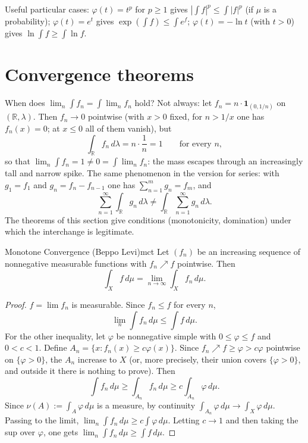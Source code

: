 \documentclass[11pt, a4paper]{article}
\begin{document}
\obs Useful particular cases: $\varphi(t) = t^p$ for $p \ge 1$ gives $|\int f|^p \le \int |f|^p$ (if
$\mu$ is a probability); $\varphi(t) = e^t$ gives $\exp(\int f) \le \int e^f$; $\varphi(t) = -\ln t$
(with $t > 0$) gives $\ln \int f \ge \int \ln f$.

\newpage

\section{Convergence theorems}

When does $\lim_n \int f_n = \int \lim_n f_n$ hold? Not always: let $f_n = n \cdot
\mathbf{1}_{(0, 1/n)}$ on $(\mathbb{R}, \lambda)$. Then $f_n \to 0$ pointwise (with
$x > 0$ fixed, for $n > 1/x$ one has $f_n(x) = 0$; at $x \le 0$ all of them vanish), but
$$ \int_{\mathbb{R}} f_n \, d\lambda = n \cdot \frac{1}{n} = 1 \qquad \text{for every } n, $$
so that $\lim_n \int f_n = 1 \ne 0 = \int \lim_n f_n$: the mass escapes through an increasingly
tall and narrow spike. The same phenomenon in the version for series: with $g_1 = f_1$ and
$g_n = f_n - f_{n-1}$ one has $\sum_{n=1}^m g_n = f_m$, and
$$ \sum_{n=1}^\infty \int_{\mathbb{R}} g_n \, d\lambda \ne \int_{\mathbb{R}}
\sum_{n=1}^\infty g_n \, d\lambda. $$
The theorems of this section give conditions (monotonicity, domination) under which the
interchange is legitimate.

\begin{teorema}{Monotone Convergence (Beppo Levi)}{mct}
Let $(f_n)$ be an increasing sequence of nonnegative measurable functions with $f_n \nearrow f$
pointwise. Then
$$ \int_X f \, d\mu = \lim_{n \to \infty} \int_X f_n \, d\mu. $$
\end{teorema}

\begin{proof}
$f = \lim f_n$ is measurable. Since $f_n \le f$ for every $n$,
$$ \lim_n \int f_n \, d\mu \le \int f \, d\mu. $$
For the other inequality, let $\varphi$ be nonnegative simple with $0 \le \varphi \le f$ and $0 < c < 1$.
Define $A_n = \{x : f_n(x) \ge c \varphi(x)\}$. Since $f_n \nearrow f \ge \varphi > c\varphi$
pointwise on $\{\varphi > 0\}$, the $A_n$ increase to $X$ (or, more precisely, their union covers
$\{\varphi > 0\}$, and outside it there is nothing to prove). Then
$$ \int f_n \, d\mu \ge \int_{A_n} f_n \, d\mu \ge c \int_{A_n} \varphi \, d\mu. $$
Since $\nu(A) := \int_A \varphi \, d\mu$ is a measure, by continuity
$\int_{A_n} \varphi \, d\mu \to \int_X \varphi \, d\mu$. Passing to the limit,
$\lim_n \int f_n \, d\mu \ge c \int \varphi \, d\mu$. Letting $c \to 1$ and then taking the sup over $\varphi$,
one gets $\lim_n \int f_n \, d\mu \ge \int f \, d\mu$.
\end{proof}
\end{document}
